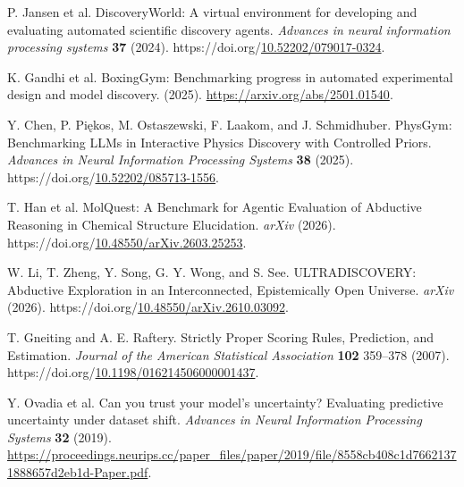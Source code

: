 \documentclass[12pt,a4paper]{article}
\newlength{\csllabelwidth}\setlength{\csllabelwidth}{2em}
\newenvironment{CSLReferences}[2]{\small\setlength{\parindent}{0pt}\setlength{\parskip}{4pt}}{\par}
\newcommand{\CSLLeftMargin}[1]{\par\noindent\makebox[\csllabelwidth][l]{#1}}
\newcommand{\CSLRightInline}[1]{\parbox[t]{\dimexpr\linewidth-\csllabelwidth\relax}{#1}\par}
\begin{document}
\begin{CSLReferences}{0}{1}
\hypertarget{ref-jansen2024discoveryworld}{}
\CSLLeftMargin{17. }%
\CSLRightInline{P. Jansen et al. {DiscoveryWorld}: A virtual environment for developing and evaluating automated scientific discovery agents. \emph{Advances in neural information processing systems} \textbf{37} (2024). https://doi.org/\href{https://doi.org/10.52202/079017-0324}{10.52202/079017-0324}.}

\hypertarget{ref-gandhi2025boxinggym}{}
\CSLLeftMargin{18. }%
\CSLRightInline{K. Gandhi et al. {BoxingGym}: Benchmarking progress in automated experimental design and model discovery. (2025). \url{https://arxiv.org/abs/2501.01540}.}

\hypertarget{ref-chen2025physgym}{}
\CSLLeftMargin{19. }%
\CSLRightInline{Y. Chen, P. Piękos, M. Ostaszewski, F. Laakom, and J. Schmidhuber. {PhysGym: Benchmarking LLMs in Interactive Physics Discovery with Controlled Priors}. \emph{{Advances in Neural Information Processing Systems}} \textbf{38} (2025). https://doi.org/\href{https://doi.org/10.52202/085713-1556}{10.52202/085713-1556}.}

\hypertarget{ref-han2026molquest}{}
\CSLLeftMargin{20. }%
\CSLRightInline{T. Han et al. {MolQuest: A Benchmark for Agentic Evaluation of Abductive Reasoning in Chemical Structure Elucidation}. \emph{arXiv} (2026). https://doi.org/\href{https://doi.org/10.48550/arXiv.2603.25253}{10.48550/arXiv.2603.25253}.}

\hypertarget{ref-li2026ultradiscovery}{}
\CSLLeftMargin{21. }%
\CSLRightInline{W. Li, T. Zheng, Y. Song, G. Y. Wong, and S. See. {ULTRADISCOVERY: Abductive Exploration in an Interconnected, Epistemically Open Universe}. \emph{arXiv} (2026). https://doi.org/\href{https://doi.org/10.48550/arXiv.2610.03092}{10.48550/arXiv.2610.03092}.}

\hypertarget{ref-gneiting2007scoring}{}
\CSLLeftMargin{22. }%
\CSLRightInline{T. Gneiting and A. E. Raftery. {Strictly Proper Scoring Rules, Prediction, and Estimation}. \emph{Journal of the American Statistical Association} \textbf{102} 359--378 (2007). https://doi.org/\href{https://doi.org/10.1198/016214506000001437}{10.1198/016214506000001437}.}

\hypertarget{ref-ovadia2019uncertainty}{}
\CSLLeftMargin{23. }%
\CSLRightInline{Y. Ovadia et al. {Can you trust your model's uncertainty? Evaluating predictive uncertainty under dataset shift}. \emph{{Advances in Neural Information Processing Systems}} \textbf{32} (2019). \url{https://proceedings.neurips.cc/paper_files/paper/2019/file/8558cb408c1d76621371888657d2eb1d-Paper.pdf}.}

\end{CSLReferences}
\end{document}
